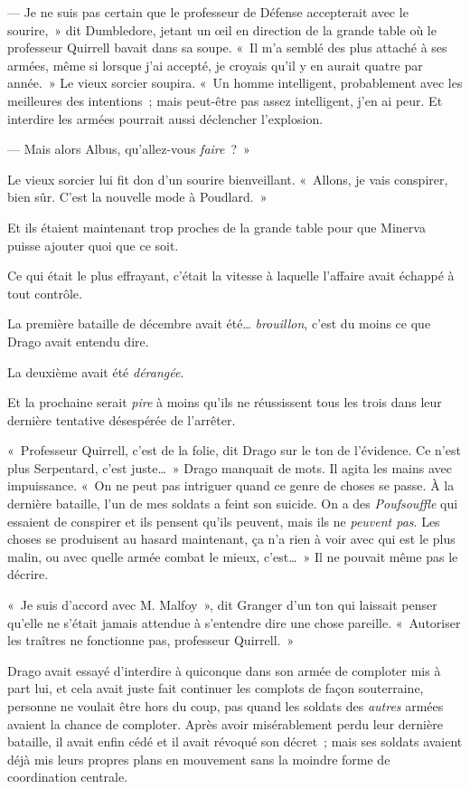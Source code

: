 --- Je ne suis pas certain que le professeur de Défense accepterait avec le sourire,~» dit Dumbledore, jetant un œil en direction de la grande table où le professeur Quirrell bavait dans sa soupe. «~Il m'a semblé des plus attaché à ses armées, même si lorsque j'ai accepté, je croyais qu'il y en aurait quatre par année.~» Le vieux sorcier soupira. «~Un homme intelligent, probablement avec les meilleures des intentions~; mais peut-être pas assez intelligent, j'en ai peur. Et interdire les armées pourrait aussi déclencher l'explosion.

--- Mais alors Albus, qu'allez-vous \emph{faire}~?~»

Le vieux sorcier lui fit don d'un sourire bienveillant. «~Allons, je vais conspirer, bien sûr. C'est la nouvelle mode à Poudlard.~»

Et ils étaient maintenant trop proches de la grande table pour que Minerva puisse ajouter quoi que ce soit.

\later

Ce qui était le plus effrayant, c'était la vitesse à laquelle l'affaire avait échappé à tout contrôle.

La première bataille de décembre avait été… \emph{brouillon}, c'est du moins ce que Drago avait entendu dire.

La deuxième avait été \emph{dérangée}.

Et la prochaine serait \emph{pire} à moins qu'ils ne réussissent tous les trois dans leur dernière tentative désespérée de l'arrêter.

«~Professeur Quirrell, c'est de la folie, dit Drago sur le ton de l'évidence. Ce n'est plus Serpentard, c'est juste…~» Drago manquait de mots. Il agita les mains avec impuissance. «~On ne peut pas intriguer quand ce genre de choses se passe. À la dernière bataille, l'un de mes soldats a feint son suicide. On a des \emph{Poufsouffle} qui essaient de conspirer et ils pensent qu'ils peuvent, mais ils ne \emph{peuvent pas}. Les choses se produisent au hasard maintenant, ça n'a rien à voir avec qui est le plus malin, ou avec quelle armée combat le mieux, c'est…~» Il ne pouvait même pas le décrire.

«~Je suis d'accord avec M. Malfoy~», dit Granger d'un ton qui laissait penser qu'elle ne s'était jamais attendue à s'entendre dire une chose pareille. «~Autoriser les traîtres ne fonctionne pas, professeur Quirrell.~»

Drago avait essayé d'interdire à quiconque dans son armée de comploter mis à part lui, et cela avait juste fait continuer les complots de façon souterraine, personne ne voulait être hors du coup, pas quand les soldats des \emph{autres} armées avaient la chance de comploter. Après avoir misérablement perdu leur dernière bataille, il avait enfin cédé et il avait révoqué son décret~; mais ses soldats avaient déjà mis leurs propres plans en mouvement sans la moindre forme de coordination centrale.

